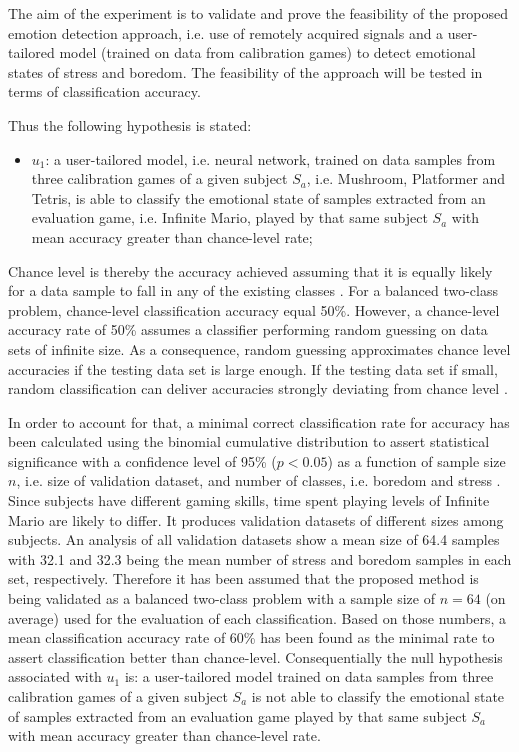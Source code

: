 The aim of the experiment is to validate and prove the feasibility of the proposed emotion detection approach, i.e. use of remotely acquired signals and a user-tailored model (trained on data from calibration games) to detect emotional states of stress and boredom. The feasibility of the approach will be tested in terms of classification accuracy.

Thus the following hypothesis is stated:

\begin{itemize}
  \item $u_1$: a user-tailored model, i.e. neural network, trained on data samples from three calibration games of a given subject $S_a$, i.e. Mushroom, Platformer and Tetris, is able to classify the emotional state of samples extracted from an evaluation game, i.e. Infinite Mario, played by that same subject $S_a$ with mean accuracy greater than chance-level rate;
\end{itemize}

Chance level is thereby the accuracy achieved assuming that it is equally likely for a data sample to fall in any of the existing classes \parencite{kassraian2016promises}. For a balanced two-class problem, chance-level classification accuracy equal 50\%. However, a chance-level accuracy rate of 50\% assumes a classifier performing random guessing on data sets of infinite size. As a consequence, random guessing approximates chance level accuracies if the testing data set is large enough. If the testing data set if small, random classification can deliver accuracies strongly deviating from chance level \parencite{combrisson2015exceeding}.

In order to account for that, a minimal correct classification rate for accuracy has been calculated using the binomial cumulative distribution to assert statistical significance with a confidence level of 95\% ($p < 0.05$) as a function of sample size $n$, i.e. size of validation dataset, and number of classes, i.e. boredom and stress \parencite{combrisson2015exceeding}. Since subjects have different gaming skills, time spent playing levels of Infinite Mario are likely to differ. It produces validation datasets of different sizes among subjects. An analysis of all validation datasets show a mean size of 64.4 samples with 32.1 and 32.3 being the mean number of stress and boredom samples in each set, respectively. Therefore it has been assumed that the proposed method is being validated as a balanced two-class problem with a sample size of $n=64$ (on average) used for the evaluation of each classification. Based on those numbers, a mean classification accuracy rate of 60\% has been found as the minimal rate to assert classification better than chance-level. Consequentially the null hypothesis associated with $u_1$ is: a user-tailored model trained on data samples from three calibration games of a given subject $S_a$ is not able to classify the emotional state of samples extracted from an evaluation game played by that same subject $S_a$ with mean accuracy greater than chance-level rate.

